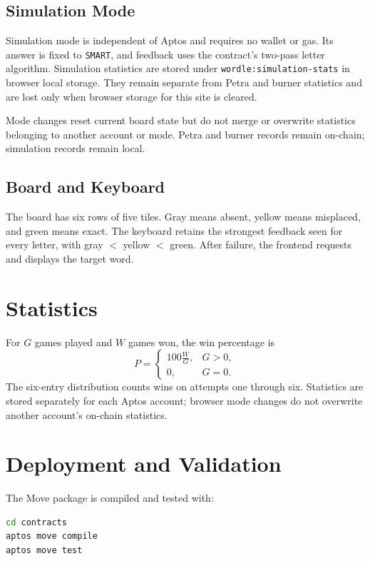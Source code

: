 \documentclass[10pt]{article}
\begin{document}
\subsection{Simulation Mode}

Simulation mode is independent of Aptos and requires no wallet or gas. Its answer is fixed to \texttt{SMART}, and feedback uses the contract's two-pass letter algorithm. Simulation statistics are stored under \texttt{wordle:simulation-stats} in browser local storage. They remain separate from Petra and burner statistics and are lost only when browser storage for this site is cleared.

Mode changes reset current board state but do not merge or overwrite statistics belonging to another account or mode. Petra and burner records remain on-chain; simulation records remain local.

\subsection{Board and Keyboard}

The board has six rows of five tiles. Gray means absent, yellow means misplaced, and green means exact. The keyboard retains the strongest feedback seen for every letter, with gray $<$ yellow $<$ green. After failure, the frontend requests and displays the target word.

\section{Statistics}

For $G$ games played and $W$ games won, the win percentage is
\[
P=\begin{cases}
100\frac{W}{G},&G>0,\\
0,&G=0.
\end{cases}
\]
The six-entry distribution counts wins on attempts one through six. Statistics are stored separately for each Aptos account; browser mode changes do not overwrite another account's on-chain statistics.

\section{Deployment and Validation}

The Move package is compiled and tested with:
\begin{lstlisting}[language=bash]
cd contracts
aptos move compile
aptos move test
\end{lstlisting}
\end{document}
